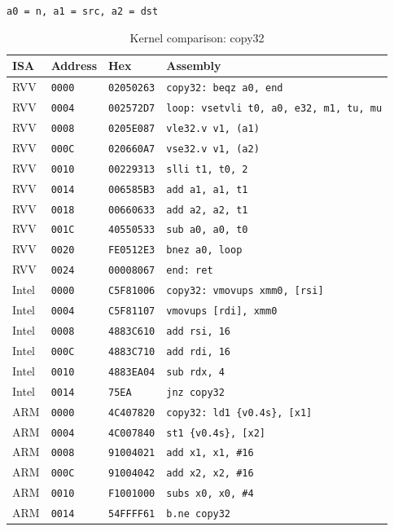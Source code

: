 \begin{table}[htbp]
\centering
\caption{Kernel comparison: copy32}
\begingroup
\scriptsize
\setlength{\tabcolsep}{4pt}
\noindent \texttt{a0 = n, a1 = src, a2 = dst}\par
\vspace{0.6ex}
\begin{tabular}{@{}l|l|l|p{7.2cm}@{}}
\toprule
ISA & Address & Hex & Assembly \\
\midrule
RVV & \texttt{0000} & \texttt{02050263} & \texttt{copy32: beqz a0, end} \\
RVV & \texttt{0004} & \texttt{002572D7} & \texttt{loop: vsetvli t0, a0, e32, m1, tu, mu} \\
RVV & \texttt{0008} & \texttt{0205E087} & \texttt{vle32.v v1, (a1)} \\
RVV & \texttt{000C} & \texttt{020660A7} & \texttt{vse32.v v1, (a2)} \\
RVV & \texttt{0010} & \texttt{00229313} & \texttt{slli t1, t0, 2} \\
RVV & \texttt{0014} & \texttt{006585B3} & \texttt{add a1, a1, t1} \\
RVV & \texttt{0018} & \texttt{00660633} & \texttt{add a2, a2, t1} \\
RVV & \texttt{001C} & \texttt{40550533} & \texttt{sub a0, a0, t0} \\
RVV & \texttt{0020} & \texttt{FE0512E3} & \texttt{bnez a0, loop} \\
RVV & \texttt{0024} & \texttt{00008067} & \texttt{end: ret} \\
\midrule
Intel & \texttt{0000} & \texttt{C5F81006} & \texttt{copy32: vmovups xmm0, [rsi]} \\
Intel & \texttt{0004} & \texttt{C5F81107} & \texttt{vmovups [rdi], xmm0} \\
Intel & \texttt{0008} & \texttt{4883C610} & \texttt{add rsi, 16} \\
Intel & \texttt{000C} & \texttt{4883C710} & \texttt{add rdi, 16} \\
Intel & \texttt{0010} & \texttt{4883EA04} & \texttt{sub rdx, 4} \\
Intel & \texttt{0014} & \texttt{75EA} & \texttt{jnz copy32} \\
\midrule
ARM & \texttt{0000} & \texttt{4C407820} & \texttt{copy32: ld1 \{v0.4s\}, [x1]} \\
ARM & \texttt{0004} & \texttt{4C007840} & \texttt{st1 \{v0.4s\}, [x2]} \\
ARM & \texttt{0008} & \texttt{91004021} & \texttt{add x1, x1, \#16} \\
ARM & \texttt{000C} & \texttt{91004042} & \texttt{add x2, x2, \#16} \\
ARM & \texttt{0010} & \texttt{F1001000} & \texttt{subs x0, x0, \#4} \\
ARM & \texttt{0014} & \texttt{54FFFF61} & \texttt{b.ne copy32} \\
\bottomrule
\end{tabular}
\endgroup
\end{table}
\noindent{}\par
